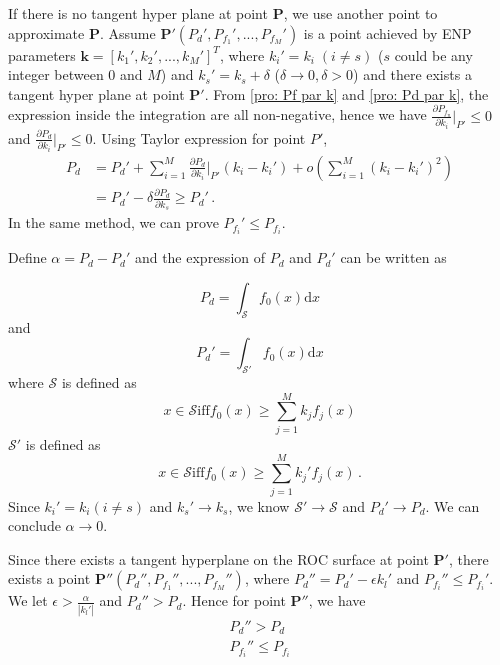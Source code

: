 \documentclass[12pt,journal,a4paper,twoside,onecolumn]{IEEEtran}
\begin{document}
\begin{spacing}{2.5}
If there is no tangent hyper plane at point $\mathbf{P}$, we use another point to approximate $\mathbf{P}$. 
Assume $\mathbf{P}' (P_d', P_{f_1}', ..., P_{f_M}')$ is a point achieved by ENP parameters $\mathbf{k}=[k_1', k_2', ..., k_M']^T$, where $k_i' = k_i \;(i \neq s)$ ($s$ could be any integer between $0$ and $M$) and $k_s' = k_s + \delta$ ($\delta \rightarrow 0, \delta > 0$) and there exists a tangent hyper plane at point $\mathbf{P}'$. From \eqref{pro: Pf par k} and \eqref{pro: Pd par k}, the expression inside the integration are all non-negative, hence we have $\frac{\partial P_{f_n}}{\partial k_i}|_{P'} \leq 0$ and $\frac{\partial P_d}{\partial k_i}|_{P'} \leq 0$. Using Taylor expression for point $P'$,
\begin{equation}
\begin{split}
P_d &= P_d' + \sum_{i=1}^{M}\frac{\partial P_d}{\partial k_i}\bigg|_{P'}(k_i - k_i') + o(\sum_{i=1}^{M}(k_i-k_i')^2)\\
&= P_d' - \delta\frac{\partial P_d}{\partial k_s} \geq P_d'\,.
\end{split}
\end{equation}
In the same method, we can prove $P_{f_i}' \leq P_{f_i}$.

Define $\alpha = P_d - P_d'$ and the expression of $P_d$ and $P_d'$ can be written as

\begin{equation}
  P_d = \int_{\mathcal{S}}f_0(x)\mathrm{d}x 
\end{equation}
and
\begin{equation}
  P_d' = \int_{\mathcal{S}'}f_0(x)\mathrm{d}x 
\end{equation}
where $\mathcal{S}$ is defined as 
\begin{equation}
x \in \mathcal{S} \text{iff} f_0(x) \geq \sum_{j=1}^M k_jf_j(x)
\end{equation}
$\mathcal{S}'$ is defined as
\begin{equation}
x \in \mathcal{S} \text{iff} f_0(x) \geq \sum_{j=1}^M k_j'f_j(x)\,.
\end{equation}
Since $k_i' = k_i (i \neq s)$ and $k_s' \rightarrow k_s$, we know $\mathcal{S}' \rightarrow \mathcal{S}$ and $P_d' \rightarrow P_d$. We can conclude $\alpha \rightarrow 0$.

Since there exists a tangent hyperplane on the ROC surface at point $\mathbf{P}'$, there exists a point $\mathbf{P}'' (P_d'', P_{f_1}'', ..., P_{f_M}'')$, where $P_d'' = P_d' - \epsilon k_l'$ and $P_{f_i}'' \leq P_{f_i}'$. We let $\epsilon > \frac{\alpha}{|k_l'|}$ and $P_d'' > P_d$. Hence for point $\mathbf{P}''$, we have 
\begin{equation}
\begin{split}
P_d'' > P_d\\
P_{f_i}'' \leq P_{f_i}
\end{split}
\end{equation}



\end{spacing}
\end{document}
